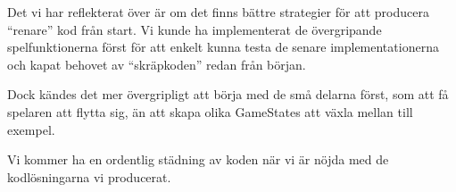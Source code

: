 \documentclass{TDP005mall}
\begin{document}
Det vi har reflekterat över är om det finns bättre strategier för att producera “renare” kod från start. Vi kunde ha implementerat de övergripande spelfunktionerna först för att enkelt kunna testa de senare implementationerna och kapat behovet av “skräpkoden” redan från början.

Dock kändes det mer övergripligt att börja med de små delarna först, som att få spelaren att flytta sig, än att skapa olika GameStates att växla mellan till exempel. 

Vi kommer ha en ordentlig städning av koden när vi är nöjda med de kodlösningarna vi producerat.
\end{document}
